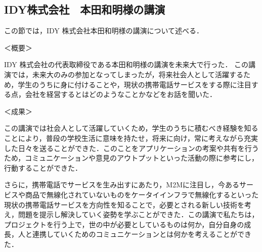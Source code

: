 \subsection{IDY株式会社　本田和明様の講演}
\par
この節では，IDY 株式会社本田和明様の講演について述べる．
\par
＜概要＞
\par
IDY 株式会社の代表取締役である本田和明様の講演を未来大で行った． この講演では，未来大のみの参加となってしまったが，将来社会人として活躍するため，学生のうちに身に付けることや，現状の携帯電話サービスをする際に注目する点，会社を経営するとはどのようなことかなどをお話を聞いた．
\par
＜成果＞
\par
この講演では社会人として活躍していくため，学生のうちに積むべき経験を知ることにより，普段の学校生活に意味を持たせ，将来に向け，常に考えながら充実した日々を送ることができた．このことをアプリケーションの考案や共有を行うため，コミュニケーションや意見のアウトプットといった活動の際に参考にし，行動することができた．
\par
さらに，携帯電話でサービスを生み出すにあたり，M2Mに注目し，今あるサービスや商品で無線化されていないものをケータイインフラで無線化するといった現状の携帯電話サービスを方向性を知ることで，必要とされる新しい技術を考え，問題を提示し解決していく姿勢を学ぶことができた．この講演で私たちは，プロジェクトを行う上で，世の中が必要としているものは何か，自分自身の成長，人と連携していくためのコミュニケーションとは何かを考えることができた．
